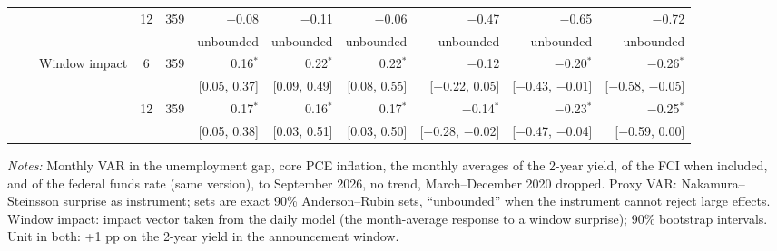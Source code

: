 \begin{longtable}{lllcrrrrrrr}
 &  &  & 12 & 359 & $-$0.08 & $-$0.11 & $-$0.06 & $-$0.47 & $-$0.65 & $-$0.72\\
 & & & & & {\tiny unbounded} & {\tiny unbounded} & {\tiny unbounded} & {\tiny unbounded} & {\tiny unbounded} & {\tiny unbounded}\\
 &  & Window impact & 6 & 359 & 0.16$^{*}$ & 0.22$^{*}$ & 0.22$^{*}$ & $-$0.12 & $-$0.20$^{*}$ & $-$0.26$^{*}$\\
 & & & & & {\tiny [0.05, 0.37]} & {\tiny [0.09, 0.49]} & {\tiny [0.08, 0.55]} & {\tiny [$-$0.22, 0.05]} & {\tiny [$-$0.43, $-$0.01]} & {\tiny [$-$0.58, $-$0.05]}\\
 &  &  & 12 & 359 & 0.17$^{*}$ & 0.16$^{*}$ & 0.17$^{*}$ & $-$0.14$^{*}$ & $-$0.23$^{*}$ & $-$0.25$^{*}$\\
 & & & & & {\tiny [0.05, 0.38]} & {\tiny [0.03, 0.51]} & {\tiny [0.03, 0.50]} & {\tiny [$-$0.28, $-$0.02]} & {\tiny [$-$0.47, $-$0.04]} & {\tiny [$-$0.59, 0.00]}\\
\end{longtable}
\begin{flushleft}\footnotesize\textit{Notes:} Monthly VAR in the unemployment gap, core PCE inflation, the monthly averages of the 2-year yield, of the FCI when included, and of the federal funds rate (same version), to September 2026, no trend, March--December 2020 dropped. Proxy VAR: Nakamura--Steinsson surprise as instrument; sets are exact 90\% Anderson--Rubin sets, ``unbounded'' when the instrument cannot reject large effects. Window impact: impact vector taken from the daily model (the month-average response to a window surprise); 90\% bootstrap intervals. Unit in both: +1 pp on the 2-year yield in the announcement window.\end{flushleft}
\endgroup
